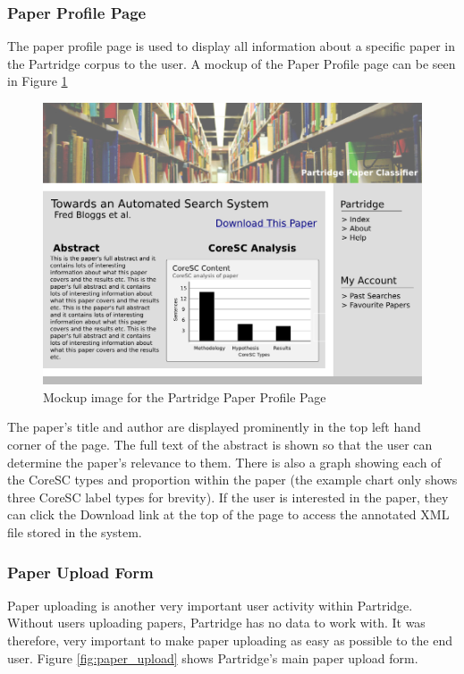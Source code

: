 \subsubsection{ Paper Profile Page }

The paper profile page is used to display all information about a specific
paper in the Partridge corpus to the user. A mockup of the Paper Profile page
can be seen in Figure \ref{fig:paper_profile}

\begin{figure}[!htb]
\vspace{5mm}
\centering
\includegraphics[width=\textwidth]{images/design/profile_mockup.png}
\caption{Mockup image for the Partridge Paper Profile Page}
\label{fig:paper_profile}
\end{figure}

The paper's title and author are displayed prominently in the top left hand
corner of the page. The full text of the abstract is shown so that the user can determine the paper's relevance to them. There is also a graph showing
each of the CoreSC types and proportion within the paper (the example chart only
shows three CoreSC label types for brevity). If the user is
interested in the paper, they can click the Download link at the top of the
page to access the annotated XML file stored in the system.

\subsubsection{Paper Upload Form}
Paper uploading is another very important user activity within Partridge.
Without users uploading papers, Partridge has no data to work with. It was
therefore, very important to make paper uploading as easy as possible to
the end user. Figure \ref{fig:paper_upload} shows Partridge's main paper upload
form. 

